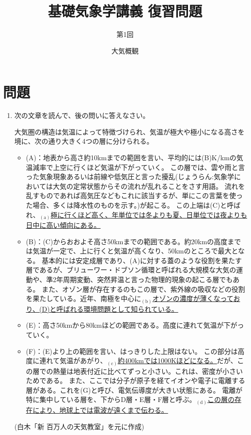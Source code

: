 \documentclass{jsarticle}
\newenvironment{problems}
{
  \renewcommand\labelenumi{\doublebox{\arabic{enumi}}}
  \begin{enumerate}
}{
  \end{enumerate}
  \renewcommand\labelenumi{\arabic{enumi}.}
}
\begin{document}
\title{基礎気象学講義 復習問題} %
\author{第1回} %
\date{大気概観} %
\maketitle

\section{問題}

    \begin{problems}
    \item 次の文章を読んで、後の問いに答えなさい。
        \begin{screen}
        大気圏の構造は気温によって特徴づけられ、気温が極大や極小になる高さを境に、次の通り大きく4つの層に分けられる。

            \begin{itemize}
            \item (A)：地表から高さ約10kmまでの範囲を言い、平均的には(B)K/kmの気温減率で上空に行くほど気温が下がっていく。
            この層では、雲や雨と言った気象現象あるいは前線や低気圧と言った擾乱(じょうらん:気象学においては大気の定常状態からその流れが乱れることをさす用語。
            流れを乱すものであれば高気圧などもこれに該当するが、単にこの言葉を使った場合、多くは降水性のものを示す。)が起こる。
            この上端は(C)と呼ばれ、$_{(\mathrm{a})}$\underline{極に行くほど高く、年単位では冬よりも夏、日単位では夜よりも日中に高い傾向にある。}
            \item (B)：(C)からおおよそ高さ50kmまでの範囲である。約20kmの高度までは気温が一定で、上に行くと気温が高くなり、50kmのところで最大となる。
            基本的には安定成層であり、(A)に対する蓋のような役割を果たす層であるが、ブリューワー・ドブソン循環と呼ばれる大規模な大気の運動や、準2年周期変動、突然昇温と言った物理的現象の起こる層でもある。
            また、オゾン層が存在するのもこの層で、紫外線の吸収などの役割を果たしている。近年、南極を中心に$_{(\mathrm{b})}$\underline{オゾンの濃度が薄くなっており、(D)と呼ばれる環境問題として知られている。}
            \item (E)：高さ50kmから80kmほどの範囲である。高度に連れて気温が下がっていく。
            \item (F)：(E)より上の範囲を言い、はっきりした上限はない。
            この部分は高度に連れて気温があがり、$_{(\mathrm{c})}$\underline{約400kmでは1000Kほどになる。}だが、この層での熱量は地表付近に比べてずっと小さい。これは、密度が小さいためである。
            また、ここでは分子が原子を経てイオンや電子に電離する層がある。これを(G)と呼び、電気伝導度が大きい状態にある。
            電離が特に集中している層を、下からD層・E層・F層と呼ぶ。$_{(\mathrm{d})}$\underline{この層の存在により、地球上では電波が遠くまで伝わる。}
            \end{itemize}
            \begin{flushright}
            (白木「新 百万人の天気教室」を元に作成)
            \end{flushright}
        \end{screen}


\end{problems}
\end{document}
